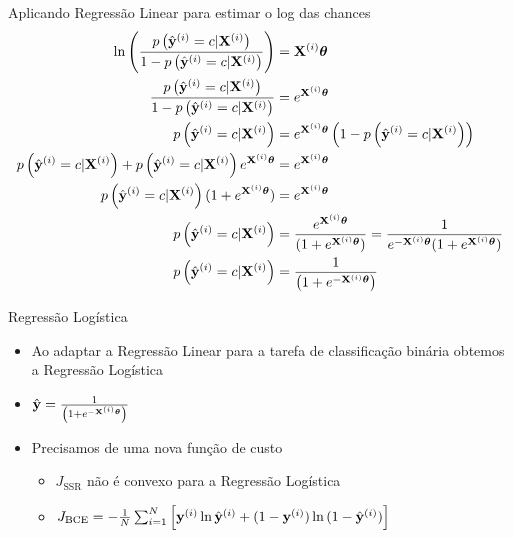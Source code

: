 \documentclass[aspectratio=169,xcolor=dvipsnames]{beamer}
\begin{document}
\begin{frame}{Aplicando Regressão Linear para estimar o log das chances}
\small
\begin{align*}
    \ln{\left(\frac{p\left(\hat{\mathbf{y}}^{(i)}=c|\mathbf{X}^{(i)}\right)}{1-p\left(\hat{\mathbf{y}}^{(i)}=c|\mathbf{X}^{(i)}\right)}\right)} &= \mathbf{X}^{(i)}\bm{\theta}\\
    \frac{p\left(\hat{\mathbf{y}}^{(i)}=c|\mathbf{X}^{(i)}\right)}{1-p\left(\hat{\mathbf{y}}^{(i)}=c|\mathbf{X}^{(i)}\right)} &= e^{\mathbf{X}^{(i)}\bm{\theta}}\\
    p\left(\hat{\mathbf{y}}^{(i)}=c|\mathbf{X}^{(i)}\right) &= e^{\mathbf{X}^{(i)}\bm{\theta}}\left(1-p\left(\hat{\mathbf{y}}^{(i)}=c|\mathbf{X}^{(i)}\right)\right)\\
    p\left(\hat{\mathbf{y}}^{(i)}=c|\mathbf{X}^{(i)}\right) +p\left(\hat{\mathbf{y}}^{(i)}=c|\mathbf{X}^{(i)}\right)e^{\mathbf{X}^{(i)}\bm{\theta}} &= e^{\mathbf{X}^{(i)}\bm{\theta}}\\
    p\left(\hat{\mathbf{y}}^{(i)}=c|\mathbf{X}^{(i)}\right)(1+e^{\mathbf{X}^{(i)}\bm{\theta}}) &= e^{\mathbf{X}^{(i)}\bm{\theta}}\\
    p\left(\hat{\mathbf{y}}^{(i)}=c|\mathbf{X}^{(i)}\right) &= \frac{e^{\mathbf{X}^{(i)}\bm{\theta}}}{(1+e^{\mathbf{X}^{(i)}\bm{\theta}})}= \frac{1}{e^{-\mathbf{X}^{(i)}\bm{\theta}}(1+e^{\mathbf{X}^{(i)}\bm{\theta}})}\\
    p\left(\hat{\mathbf{y}}^{(i)}=c|\mathbf{X}^{(i)}\right) &= \frac{1}{\left(1+e^{-\mathbf{X}^{(i)}\bm{\theta}}\right)}\\
\end{align*}
\end{frame}

\begin{frame}{Regressão Logística}
\begin{itemize}
    \item Ao adaptar a Regressão Linear para a tarefa de classificação binária obtemos a Regressão Logística
    \item $\hat{\mathbf{y}} = \frac{1}{\left(1+e^{-\mathbf{X}^{(i)}\bm{\theta}}\right)}$
    \item Precisamos de uma nova função de custo
    \begin{itemize}
        \item $J_{\text{SSR}}$ não é convexo para a Regressão Logística
        \item $J_{\text{BCE}}=-\frac{1}{N}\sum_{i=1}^{N}\Big[\mathbf{y}^{(i)}\ln\hat{\mathbf{y}}^{(i)} +(1-\mathbf{y}^{(i)})\ln{(1-\hat{\mathbf{y}}^{(i)})}\Big]$
    \end{itemize}
\end{itemize}
    
\end{frame}
\end{document}
